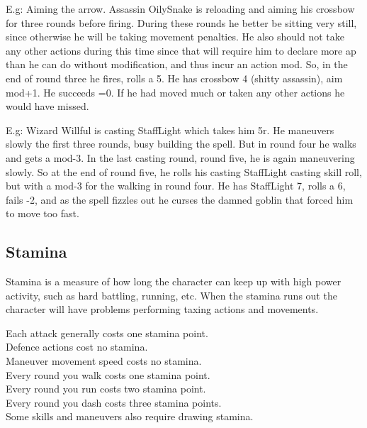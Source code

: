 E.g: Aiming the arrow. Assassin OilySnake is reloading and aiming his crossbow for three rounds before firing. During these rounds he better be sitting very still, since otherwise he will be taking movement penalties. He also should not take any other actions during this time since that will require him to declare more ap than he can do without modification, and thus incur an action mod. So, in the end of round three he fires, rolls a 5. He has crossbow 4 (shitty assassin), aim mod+1. He succeeds =0. If he had moved much or taken any other actions he would have missed.

E.g: Wizard Willful is casting StaffLight which takes him 5r. He maneuvers slowly the first three rounds, busy building the spell. But in round four he walks and gets a mod-3. In the last casting round, round five, he is again maneuvering slowly. So at the end of round five, he rolls his casting StaffLight casting skill roll, but with a mod-3 for the walking in round four. He has StaffLight 7, rolls a 6, fails -2, and as the spell fizzles out he curses the damned goblin that forced him to move too fast.
















\subsection*{Stamina}
Stamina is a measure of how long the character can keep up with high power activity, such as hard battling, running, etc. When the stamina runs out the character will have problems performing taxing actions and movements.

Each attack generally costs one stamina point. \\
Defence actions cost no stamina.\\ 
Maneuver movement speed costs no stamina.\\ 
Every round you walk costs one stamina point. \\
Every round you run costs two stamina point. \\
Every round you dash costs three stamina points. \\
Some skills and maneuvers also require drawing stamina.

